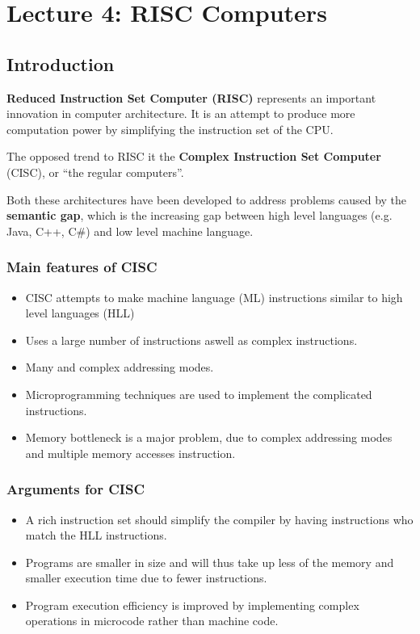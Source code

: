 \section{Lecture 4: RISC Computers}
\subsection{Introduction}

\textbf{Reduced Instruction Set Computer (RISC)} represents an important innovation in computer architecture. It is an attempt to produce more computation power by simplifying the instruction set of the CPU.

The opposed trend to RISC it the \textbf{Complex Instruction Set Computer} (CISC), or ``the regular computers''.

Both these architectures have been developed to address problems caused by the \textbf{semantic gap}, which is the increasing gap between high level languages (e.g. Java, C++, C\#) and low level machine language.

\subsubsection{Main features of CISC}

\begin{itemize}
\item CISC attempts to make machine language (ML) instructions similar to high level languages (HLL)
\item Uses a large number of instructions aswell as complex instructions.
\item Many and complex addressing modes.
\item Microprogramming techniques are used to implement the complicated instructions.
\item Memory bottleneck is a major problem, due to complex addressing modes and multiple memory accesses instruction.
\end{itemize}

\subsubsection{Arguments for CISC}

\begin{itemize}
\item A rich instruction set should simplify the compiler by having instructions who match the HLL instructions.
\item Programs are smaller in size and will thus take up less of the memory and smaller execution time due to fewer instructions.
\item Program execution efficiency is improved by implementing complex operations in microcode rather than machine code.
\end{itemize}

